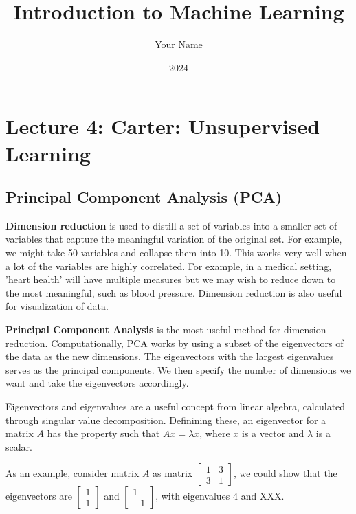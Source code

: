 \documentclass[11pt]{article}
\title{Introduction to Machine Learning}
\author{Your Name}
\date{2024}
\begin{document}
\maketitle

\section{Lecture 4: Carter: Unsupervised Learning}

\subsection{Principal Component Analysis (PCA)}

\textbf{Dimension reduction} is used to distill a set of variables into a smaller set of variables that capture the meaningful variation of the original set.
For example, we might take 50 variables and collapse them into 10.
This works very well when a lot of the variables are highly correlated.
For example, in a medical setting, 'heart health' will have multiple measures but we may wish to reduce down to the most meaningful, such as blood pressure.
Dimension reduction is also useful for visualization of data.

\textbf{Principal Component Analysis} is the most useful method for dimension reduction.
Computationally, PCA works by using a subset of the eigenvectors of the data as the new dimensions.
The eigenvectors with the largest eigenvalues serves as the principal components.
We then specify the number of dimensions we want and take the eigenvectors accordingly.

Eigenvectors and eigenvalues are a useful concept from linear algebra, calculated through singular value decomposition. Definining these, an eigenvector for a matrix $A$ has the property such that $Ax = \lambda x$, where $x$ is a vector and $\lambda$ is a scalar.

As an example, consider matrix $A$ as matrix $ \begin{bmatrix}
    1 & 3\\
    3 & 1
\end{bmatrix}$, we could show that the eigenvectors are $ \begin{bmatrix}
    1\\
    1
\end{bmatrix}$ and $ \begin{bmatrix}
    1\\
    -1
\end{bmatrix}$, with eigenvalues $4$ and XXX.
\end{document}
